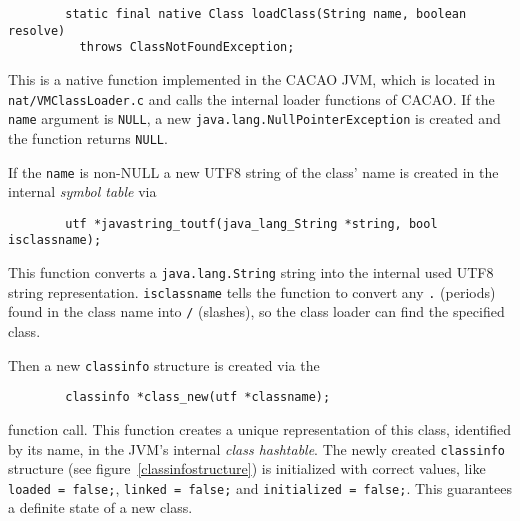 \begin{verbatim}
        static final native Class loadClass(String name, boolean resolve)
          throws ClassNotFoundException;
\end{verbatim}

\begingroup
{}
This is a native function implemented in the CACAO JVM, which is
located in \texttt{nat/VMClassLoader.c} and calls the internal loader
functions of CACAO. If the \texttt{name} argument is \texttt{NULL}, a
new \texttt{java.lang.NullPointerException} is created and the
function returns \texttt{NULL}.

\endgroup

If the \texttt{name} is non-NULL a new UTF8 string of the class' name
is created in the internal \textit{symbol table} via

\begin{verbatim}
        utf *javastring_toutf(java_lang_String *string, bool isclassname);
\end{verbatim}

This function converts a \texttt{java.lang.String} string into the
internal used UTF8 string representation. \texttt{isclassname} tells
the function to convert any \texttt{.} (periods) found in the class
name into \texttt{/} (slashes), so the class loader can find the
specified class.

Then a new \texttt{classinfo} structure is created via the

\begin{verbatim}
        classinfo *class_new(utf *classname);
\end{verbatim}

function call. This function creates a unique representation of this
class, identified by its name, in the JVM's internal \textit{class
hashtable}. The newly created \texttt{classinfo} structure (see
figure~\ref{classinfostructure}) is initialized with correct values,
like \texttt{loaded = false;}, \texttt{linked = false;} and
\texttt{initialized = false;}. This guarantees a definite state of a
new class.

